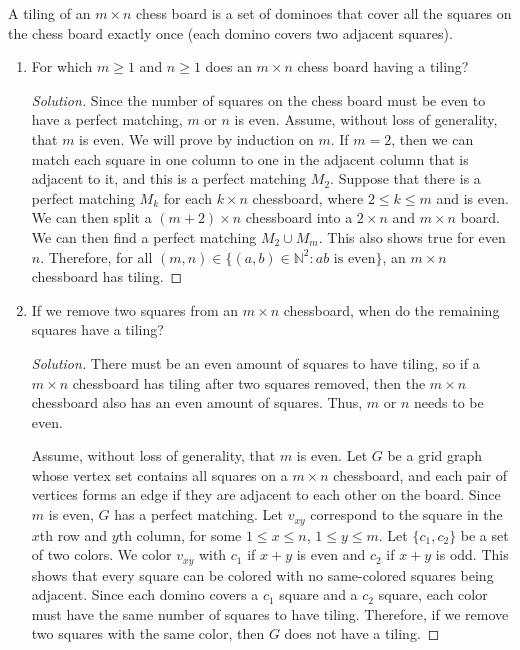 \documentclass{article}
\newenvironment{problem}[2][Problem]{\begin{trivlist}
\item[\hskip \labelsep {\bfseries #1}\hskip \labelsep {\bfseries #2.}]}{\end{trivlist}}
\begin{document}
\begin{problem}{3.8.2}
    A tiling of an $m \times n$ chess board is a set of dominoes that cover all the squares on the chess board exactly once (each domino covers two adjacent squares).
\end{problem}
\begin{enumerate}[label=(\alph*)]
    \item For which $m \geq 1$ and $n \geq 1$ does an $m \times n$ chess board having a tiling?
    \begin{proof}[Solution]
        Since the number of squares on the chess board must be even to have a perfect matching, $m$ or $n$ is even. Assume, without loss of generality, that $m$ is even. We will prove by induction on $m$. If $m = 2$,  then we can match each square in one column to one in the adjacent column that is adjacent to it, and this is a perfect matching $M_2$. Suppose that there is a perfect matching $M_k$ for each $k \times n$ chessboard, where $2 \leq k \leq m$ and is even. We can then split a $(m + 2) \times n$ chessboard into a $2 \times n$ and $m \times n$ board. We can then find a perfect matching $M_2 \cup M_m$. This also shows true for even $n$. Therefore, for all $(m,n) \in \{(a, b) \in \mathbb{N}^2: ab \text{ is even}\}$, an $m \times n$ chessboard has tiling. 
    \end{proof}
    
    \item If we remove two squares from an $m \times n$ chessboard, when do the remaining squares have a tiling?
    \begin{proof}[Solution]
        There must be an even amount of squares to have tiling, so if a $m \times n$ chessboard has tiling after two squares removed, then the $m \times n$ chessboard also has an even amount of squares. Thus, $m$ or $n$ needs to be even.

        Assume, without loss of generality, that $m$ is even. Let $G$ be a grid graph whose vertex set contains all squares on a $m \times n$ chessboard, and each pair of vertices forms an edge if they are adjacent to each other on the board. Since $m$ is even, $G$ has a perfect matching. Let $v_{xy}$ correspond to the square in the $x$th row and $y$th column, for some $1 \leq x \leq n$, $1 \leq y \leq m$. Let $\{c_1, c_2\}$ be a set of two colors. We color $v_{xy}$ with $c_1$ if $x + y$ is even and $c_2$ if $x + y$ is odd. This shows that every square can be colored with no same-colored squares being adjacent. Since each domino covers a $c_1$ square and a $c_2$ square, each color must have the same number of squares to have tiling. Therefore, if we remove two squares with the same color, then $G$ does not have a tiling.
        

\end{proof}
\end{enumerate}
\end{document}
